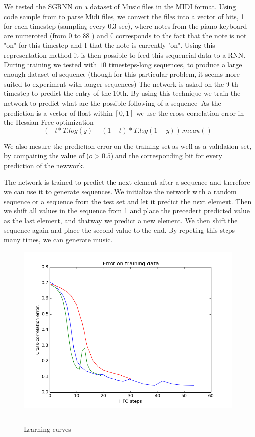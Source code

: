 We tested the SGRNN on a dataset of Music files in the MIDI format. Using code sample from \cite{boulanger2012modeling} to parse Midi files, we convert the files into a vector of bits, 1 for each timestep (sampling every 0.3 sec), where notes from the piano keyboard are numeroted (from $0$ to $88$ ) and $0$ corresponds to the fact that the note is not "on" for this timestep and $1$ that the note is currently "on". Using this representation method it is then possible to feed this sequencial data to a RNN. During training we tested with $10$ timesteps-long sequences, to produce a large enough dataset of sequence (though for this particular problem, it seems more suited to experiment with longer sequences) The network is asked on the 9-th timestep to predict the entry of the 10th. By using this technique we train the network to predict what are the possible following of a sequence. As the prediction is a vector of float within $[0, 1]$ we use the cross-correlation error in the Hessian Free optimization 
$$ (-t* T.log(y) - (1-t)* T.log(1-y)).mean() $$

We also mesure the prediction error on the training set as well as a validation set, by compairing the value of ($o>0.5$) and the corresponding bit for every prediction of the newwork.

The network is trained to predict the next element after a sequence and therefore we can use it to generate sequences. We initialize the network with a random sequence or a sequence from the test set and let it predict the next element. Then we shift all values in the sequence from 1 and place the precedent predicted value as the last element, and thatway we predict a new element. We then shift the sequence again and place the second value to the end. By repeting this steps many times, we can generate music. 


    
\begin{figure}[htbp]
    \centering
\includegraphics[scale=0.7]{Figures/sgrnn_training.png}
    \rule{35em}{0.5pt}
    \caption[Learning curves]{Learning curves}
    \label{fig:init_roll}
\end{figure}

